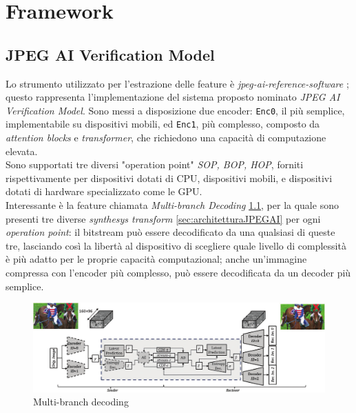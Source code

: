 \chapter{Framework }\label{ch:work}
\section{JPEG AI Verification Model}\label{sec:vm}
Lo strumento utilizzato per l'estrazione delle feature è \textit{jpeg-ai-reference-software} \cite{jpeg-ai-ref-sw}; questo rappresenta l'implementazione del sistema proposto nominato \textit{JPEG AI Verification Model}. Sono messi a disposizione due encoder: \texttt{Enc0}, il più semplice, implementabile su dispositivi mobili, ed \texttt{Enc1}, più complesso, composto da \textit{attention blocks} e\textit{ transformer}, che richiedono una capacità di computazione elevata.
\\Sono supportati tre diversi "operation point" \textit{SOP, BOP, HOP}, forniti rispettivamente per dispositivi dotati di CPU, dispositivi mobili, e dispositivi dotati di hardware specializzato come le GPU.\\
Interessante è la feature chiamata \textit{Multi-branch Decoding} \ref{fig:multibranch}, per la quale sono presenti tre diverse \textit{synthesys transform} \ref{sec:architetturaJPEGAI} per ogni \textit{operation point}: il bitstream può essere decodificato da una qualsiasi di queste tre, lasciando così la libertà al dispositivo di scegliere quale livello di complessità è più adatto per le proprie capacità computazional; anche un'immagine compressa con l'encoder più complesso, può essere decodificata da un decoder più semplice. 
\begin{figure}
    \centering
    \includegraphics[width=1\linewidth]{img/multi-branch.png}
    \caption{Multi-branch decoding}
    \label{fig:multibranch}
\end{figure}
